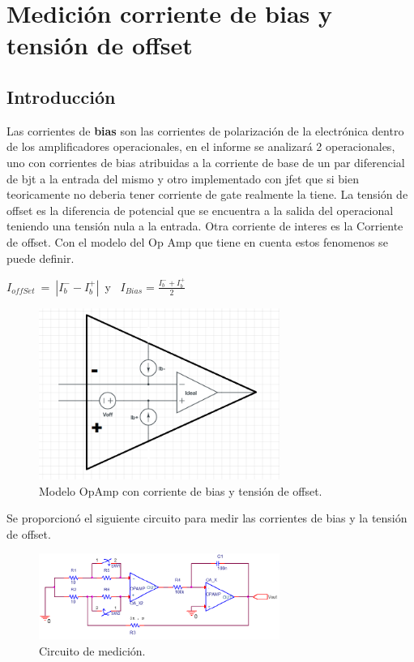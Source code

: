 
\section{Medici\'on corriente de bias y tensi\'on de offset}

\subsection{Introducción}
Las corrientes de \textbf{bias} son las corrientes de polarización de la electrónica dentro de los amplificadores operacionales, en el informe se analizará 2 operacionales, uno con corrientes de bias atribuidas a la corriente de base de un par diferencial de bjt a la entrada del mismo y otro implementado con jfet que si bien teoricamente no deberia tener corriente de gate realmente la tiene.
La tensión de offset es la diferencia de potencial que se encuentra a la salida del operacional teniendo una tensión nula a la entrada.
Otra corriente de interes es la Corriente de offset.
Con el modelo del Op Amp que tiene en cuenta estos fenomenos se puede definir.\newline
 	
 $I_{offSet} \ = \ |I_b^{-}-I_b^{+}|$\ y \ $I_{Bias}= \frac{I_b^-+I_b^{+}}{2}$
\begin{figure}[htb]	
	\centering
	\includegraphics[width=0.7\textwidth]{imagenes/opampReal.PNG}
	\caption{Modelo OpAmp con corriente de bias y tensión de offset.}
	\label{fig:OpampBias}
\end{figure}



Se proporcionó el siguiente circuito para medir las corrientes de bias y la tensión de offset.

\begin{figure}[htb]	
	\centering
	\includegraphics[width=0.7\textwidth]{imagenes/CircMedicion.PNG}
	\caption{Circuito de medición.}
	\label{fig:CircMedicion}
\end{figure}

